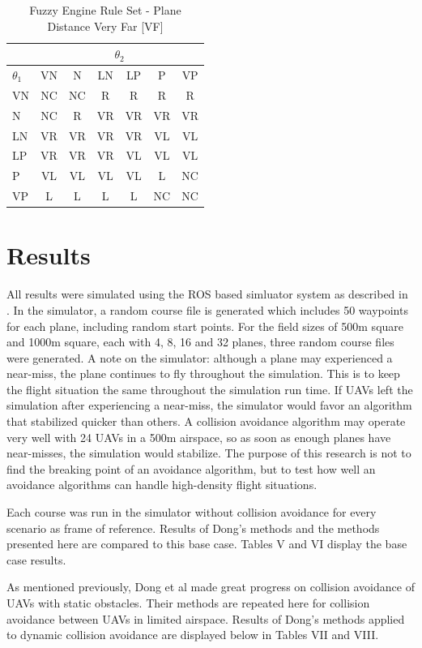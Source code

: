 \documentclass[10pt, conference, compsocconf]{IEEEtran}
\begin{document}
\begin{table}[position here!]
\centering
\caption{Fuzzy Engine Rule Set - Plane Distance Very Far [VF]}
\begin{tabular}{l | c c c c c c }
& \multicolumn{6}{c}{$\theta_2$} \\
\hline
\hline
$\theta_1$ & VN & N & LN & LP & P & VP \\
\hline
VN & NC & NC & R & R & R & R \\ 
N & NC & R & VR & VR & VR & VR \\
LN & VR & VR & VR & VR & VL & VL \\
LP & VR & VR & VR & VL & VL & VL \\
P & VL & VL & VL & VL & L & NC \\
VP & L & L & L & L & NC & NC \\
\end{tabular}
\label{tab:vf}
\end{table}
\section{Results}
All results were simulated using the ROS based simluator system as described in \cite{holtthesis}. In the simulator, a random course file is generated which includes 50 waypoints for each plane, including random start points.  For the field sizes of 500m square and 1000m square, each with 4, 8, 16 and 32 planes, three random course files were generated.  A note on the simulator: although a plane may experienced a near-miss, the plane continues to fly throughout the simulation.  This is to keep the flight situation the same throughout the simulation run time. If UAVs left the simulation after experiencing a near-miss, the simulator would favor an algorithm that stabilized quicker than others.  A collision avoidance algorithm may operate very well with 24 UAVs in a 500m airspace, so as soon as enough planes have near-misses, the simulation would stabilize.  The purpose of this research is not to find the breaking point of an avoidance algorithm, but to test how well an avoidance algorithms can handle high-density flight situations.

Each course was run in the simulator without collision avoidance for every scenario as frame of reference. Results of Dong's methods and the methods presented here are compared to this base case. Tables V and VI display the base case results.

As mentioned previously, Dong et al made great progress on collision avoidance of UAVs with static obstacles. Their methods are repeated here for collision avoidance between UAVs in limited airspace. Results of Dong's methods applied to dynamic collision avoidance are displayed below in Tables VII and VIII.
\end{document}
